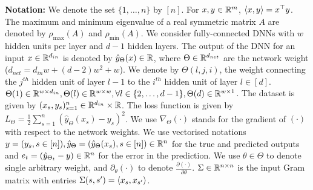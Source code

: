 \textbf{Notation:} We denote the set $\{1,\ldots, n\}$ by $[n]$. For $x,y\in\mathbb{R}^m$, $\langle x,y\rangle=x^\top y$. The maximum and minimum eigenvalue of a real symmetric matrix $A$ are denoted by $\rho_{\max}(A)$ and $\rho_{\min}(A)$. We consider fully-connected DNNs with $w$ hidden units per layer and $d-1$ hidden layers. The output of the DNN for an input $x\in\mathbb{R}^{d_{in}}$ is denoted by $\hat{y}_{\Theta}(x)\in\mathbb{R}$, where $\Theta\in\mathbb{R}^{d_{net}}$ are the network weight ($d_{net}=d_{in}w+(d-2)w^2+w$). We denote by $\Theta(l,j,i)$, the weight connecting the $j^{th}$ hidden unit of layer $l-1$ to the $i^{th}$ hidden unit of layer $l\in[d]$. $\Theta(1)\in\mathbb{R}^{w\times d_{in}}, \Theta(l)\in\mathbb{R}^{w\times w},\forall l\in\{2,\ldots,d-1\}, \Theta(d)\in\mathbb{R}^{w\times 1}$. The dataset is given by $(x_s,y_s)_{s=1}^n\in\mathbb{R}^{d_{in}}\times \mathbb{R}$. The loss function is given by $L_{\Theta}=\frac{1}{2}\sum_{s=1}^n \left(\hat{y}_{\Theta}(x_s)-y_s\right)^2$. We use $\nabla_{\Theta}(\cdot)$ stands for the gradient of $(\cdot)$ with respect to the network weights. We use vectorised notations $y=(y_s,s\in[n]), \hat{y}_{\Theta}=\left(\hat{y}_{\Theta}(x_s), s\in[n]\right)\in\mathbb{R}^n$ for the true and predicted outputs and $e_{t}= (\hat{y}_{\Theta_t}-y)\in\mathbb{R}^n$ for the error in the prediction. We use $\theta\in\Theta$ to denote single arbitrary weight, and $\partial_{\theta}(\cdot)$ to denote $\frac{\partial (\cdot)}{\partial \theta}$.  $\Sigma\in\mathbb{R}^{n\times n}$ is the input Gram matrix with entries $\Sigma(s,s')=\langle x_s,x_{s'}\rangle$.

